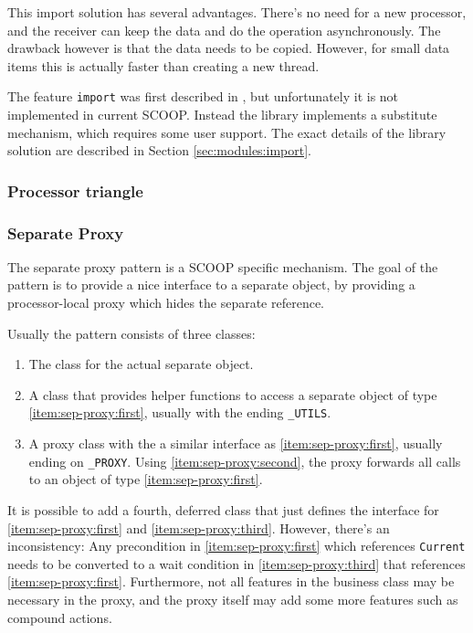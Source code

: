 \documentclass[a4paper,10pt]{report}
\begin{document}
This import solution has several advantages.
There's no need for a new processor, and the receiver can keep the data and do the operation asynchronously.
The drawback however is that the data needs to be copied.
However, for small data items this is actually faster than creating a new thread.

The feature \lstinline!import! was first described in , but unfortunately it is not implemented in current SCOOP.
Instead the library implements a substitute mechanism, which requires some user support.
The exact details of the library solution are described in Section \ref{sec:modules:import}.

\subsubsection{Processor triangle}

\subsubsection{Separate Proxy}

The separate proxy pattern is a SCOOP specific mechanism.
The goal of the pattern is to provide a nice interface to a separate object, by providing a processor-local proxy which hides the separate reference.

Usually the pattern consists of three classes:
\begin{enumerate} [label=(\arabic*)]
 \item\label{item:sep-proxy:first} The class for the actual separate object.
 \item\label{item:sep-proxy:second} A class that provides helper functions to access a separate object of type \ref{item:sep-proxy:first}, usually with the ending \lstinline!_UTILS!.
 \item\label{item:sep-proxy:third} A proxy class with the a similar interface as \ref{item:sep-proxy:first}, usually ending on \lstinline!_PROXY!.
 Using \ref{item:sep-proxy:second}, the proxy forwards all calls to an object of type \ref{item:sep-proxy:first}.
\end{enumerate}


It is possible to add a fourth, deferred class that just defines the interface for \ref{item:sep-proxy:first} and \ref{item:sep-proxy:third}.
However, there's an inconsistency: 
Any precondition in \ref{item:sep-proxy:first} which references \lstinline!Current! needs to be converted to a wait condition in \ref{item:sep-proxy:third} that references \ref{item:sep-proxy:first}.
Furthermore, not all features in the business class may be necessary in the proxy, and the proxy itself may add some more features such as compound actions.
\end{document}
